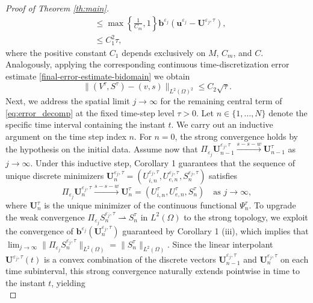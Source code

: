 \documentclass[10pt,a4paper]{amsart}
\begin{document}
\begin{proof}[Proof of Theorem \ref{th:main}]
\begin{equation}
\begin{aligned}
		&\leq \max\left\{\frac{1}{C_m},1\right\}\mathbf{b}^{\varepsilon_j}(\mathbf{u}^{\varepsilon_j}-{\mathbf{U}}^{\varepsilon_j, \tau}),\\
		& \leq C_1^2 \tau,
	\end{aligned}
\end{equation}
where the positive constant $C_1$ depends exclusively on $M$, $C_m$, and $C$. Analogously, applying the corresponding continuous time-discretization error estimate \eqref{final-error-estimate-bidomain} we obtain
\begin{equation}
	\label{eq:c2tau}
	\|(V^{\tau},S^{\tau}) - (v,s)\|_{L^2(\Omega)^2}
	\leq C_2 \sqrt\tau.
\end{equation}
Next, we address the spatial limit $j \to \infty$ for the remaining central term of \eqref{eq:error_decomp} at the fixed time-step level $\tau > 0$. Let $n \in \{1, \dots, N\}$ denote the specific time interval containing the instant $t$. We carry out an inductive argument on the time step index $n$. For $n=0$, the strong convergence holds by the hypothesis on the initial data. Assume now that $\Pi_{\varepsilon_j} \mathbf{U}_{n-1}^{\varepsilon_j,\tau} \xrightarrow{s-s-w} \mathbf{U}_{n-1}^\tau$ as $j \to \infty$. Under this inductive step, Corollary 1 guarantees that the sequence of unique discrete minimizers $\mathbf{U}_n^{\varepsilon_j,\tau} = (U_{i,n}^{\varepsilon_j,\tau}, U_{e,n}^{\varepsilon_j,\tau}, S_n^{\varepsilon_j,\tau})$ satisfies
\begin{equation*}
	\Pi_{\varepsilon_j} \mathbf{U}_n^{\varepsilon_j,\tau} \xrightarrow{s-s-w} \mathbf{U}_n^\tau = (U_{i,n}^\tau, U_{e,n}^\tau, S_n^\tau) \quad \text{as } j \to \infty,
\end{equation*}
where $\mathbf{U}_n^\tau$ is the unique minimizer of the continuous functional $\Psi_n^\tau$. To upgrade the weak convergence $\Pi_{\varepsilon_j} S_n^{\varepsilon_j,\tau} \rightharpoonup S_n^\tau$ in $L^2(\Omega)$ to the strong topology, we exploit the convergence of $\mathbf{b}^{\varepsilon_j}(\mathbf{U}_n^{\varepsilon_j,\tau})$ guaranteed by Corollary 1 (iii), which implies that $\lim_{j \to \infty} \|\Pi_{\varepsilon_j} S^{\varepsilon_j,\tau}_n\|_{L^2(\Omega)} = \|S_n^\tau\|_{L^2(\Omega)}.$ 
Since the linear interpolant $\mathbf{U}^{\varepsilon_j, \tau}(t)$ is a convex combination of the discrete vectors $\mathbf{U}_{n-1}^{\varepsilon_j,\tau}$ and $\mathbf{U}_n^{\varepsilon_j,\tau}$ on each time subinterval, this strong convergence naturally extends pointwise in time to the instant $t$, yielding
\begin{equation}

\end{equation}
\end{proof}
\end{document}
